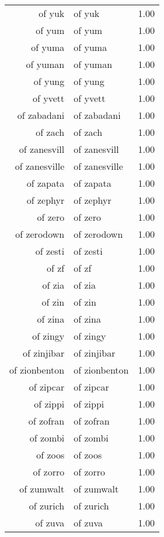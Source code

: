 \begin{table}[ht]
\begin{tabular}{rlr}
  of yuk & of yuk & 1.00 \\ 
  of yum & of yum & 1.00 \\ 
  of yuma & of yuma & 1.00 \\ 
  of yuman & of yuman & 1.00 \\ 
  of yung & of yung & 1.00 \\ 
  of yvett & of yvett & 1.00 \\ 
  of zabadani & of zabadani & 1.00 \\ 
  of zach & of zach & 1.00 \\ 
  of zanesvill & of zanesvill & 1.00 \\ 
  of zanesville & of zanesville & 1.00 \\ 
  of zapata & of zapata & 1.00 \\ 
  of zephyr & of zephyr & 1.00 \\ 
  of zero & of zero & 1.00 \\ 
  of zerodown & of zerodown & 1.00 \\ 
  of zesti & of zesti & 1.00 \\ 
  of zf & of zf & 1.00 \\ 
  of zia & of zia & 1.00 \\ 
  of zin & of zin & 1.00 \\ 
  of zina & of zina & 1.00 \\ 
  of zingy & of zingy & 1.00 \\ 
  of zinjibar & of zinjibar & 1.00 \\ 
  of zionbenton & of zionbenton & 1.00 \\ 
  of zipcar & of zipcar & 1.00 \\ 
  of zippi & of zippi & 1.00 \\ 
  of zofran & of zofran & 1.00 \\ 
  of zombi & of zombi & 1.00 \\ 
  of zoos & of zoos & 1.00 \\ 
  of zorro & of zorro & 1.00 \\ 
  of zumwalt & of zumwalt & 1.00 \\ 
  of zurich & of zurich & 1.00 \\ 
  of zuva & of zuva & 1.00 \\ 
   \hline
\end{tabular}
\end{table}
